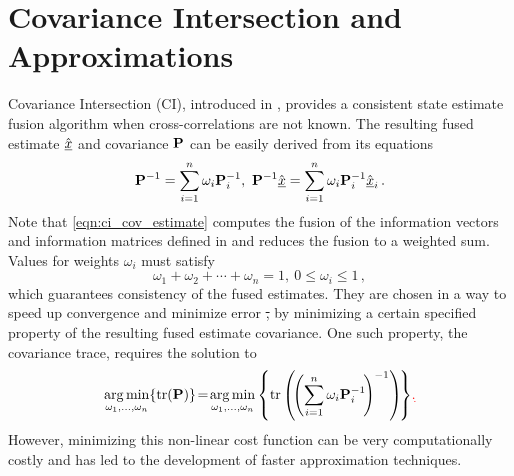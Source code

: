\documentclass[letterpaper, 10 pt, journal, twoside]{ieeetran}  %
\providecommand{\DIFadd}[1]{{\protect\color{blue}\uwave{#1}}} %
\providecommand{\DIFdel}[1]{{\protect\color{red}\sout{#1}}}                      %
\providecommand{\DIFaddbegin}{} %
\providecommand{\DIFaddend}{} %
\providecommand{\DIFdelbegin}{} %
\providecommand{\DIFdelend}{} %
\begin{document}
\section{Covariance Intersection and Approximations} \label{sec:ci}
Covariance Intersection (CI), introduced in \cite{julierNondivergentEstimationAlgorithm1997}, provides a consistent state estimate fusion algorithm when cross-correlations are not known. The resulting fused estimate $\hat{{\underline{x}}}$ and covariance ${{\mathbf{P}}}$ can be easily derived from its equations
\begin{equation}
   {\ensuremath{{\mathbf{P}}}}^{-1}=\sum_{i=1}^{n}\omega_i {{\mathbf{P}}}_i^{-1},\ {{\mathbf{P}}}^{-1} \hat{{\underline{x}}} =\sum_{i=1}^{n}\omega_i {{\mathbf{P}}}_i^{-1} \hat{{\underline{x}}}_i\,. \label{eqn:ci_cov_estimate}
\end{equation}
Note that \eqref{eqn:ci_cov_estimate} computes the fusion of the information vectors and information matrices defined in \cite{niehsenInformationFusionBased2002} and reduces the fusion to a weighted sum. Values for weights $\omega_i$ must satisfy
\begin{equation}
   \omega_1 + \omega_2 + \cdots + \omega_n = 1,\ 0 \leq \omega_i \leq 1\,, \label{eqn:ci_omega_sum_bound}
\end{equation}
which guarantees consistency of the fused estimates. They are chosen in a way to speed up convergence and minimize error \DIFdelbegin \DIFdel{, }\DIFdelend by minimizing a certain specified property of the resulting fused estimate covariance. One such property, the covariance trace, requires the solution to
\begin{equation}
   \argmin_{\omega_1,\dots,\omega_n} \{\tr(\mP)\}\! =\! \argmin_{\omega_1,\dots,\omega_n} \left\{\tr\left(\!\left(\sum_{i=1}^{n}\omega_i \mP_i^{-1}\!\right)^{-1}\right)\!\right\} \DIFdelbegin \DIFdel{\!. }\DIFdelend \label{eqn:ci_trace_min}
\end{equation}
\DIFaddbegin \DIFadd{for computing weights $\omega_i$. }\DIFaddend However, minimizing this non-linear cost function can be very computationally costly and has led to the development of faster approximation techniques.
\end{document}
